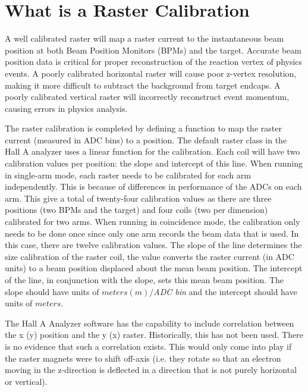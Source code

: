 \section{What is a Raster Calibration} \label{what}

A well calibrated raster will map a raster current to the instantaneous beam position at both Beam Position Monitors (BPMs) and the target. Accurate beam position data is critical for proper reconstruction of the reaction vertex of physics events. A poorly calibrated horizontal raster will cause poor z-vertex resolution, making it more difficult to subtract the background from target endcaps. A poorly calibrated vertical raster will incorrectly reconstruct event momentum, causing errors in physics analysis.


The raster calibration is completed by defining a function to map the raster current (measured in ADC bins) to a position. The default raster class in the Hall A analyzer uses a linear function for the calibration. Each coil will have two calibration values per position: the slope and intercept of this line. When running in single-arm mode, each raster needs to be calibrated for each arm independently. This is because of differences in performance of the ADCs on each arm. This give a total of twenty-four calibration values as there are three positions (two BPMs and the target) and four coils (two per dimension) calibrated for two arms. When running in coincidence mode, the calibration only needs to be done once since only one arm records the beam data that is used. In this case, there are twelve calibration values. The slope of the line determines the size calibration of the raster coil, the value converts the raster current (in ADC units) to a beam position displaced about the mean beam position. The intercept of the line, in conjunction with the slope, sets this mean beam position. The slope should have units of $meters(m)/$\textit{ADC bin} and the intercept should have units of $meters$.

The Hall A Analyzer software has the capability to include correlation between the x (y) position and the y (x) raster. Historically, this has not been used. There is no evidence that such a correlation exists. This would only come into play if the raster magnets were to shift off-axis (i.e. they rotate so that an electron moving in the z-direction is deflected in a direction that is not purely horizontal or vertical).

